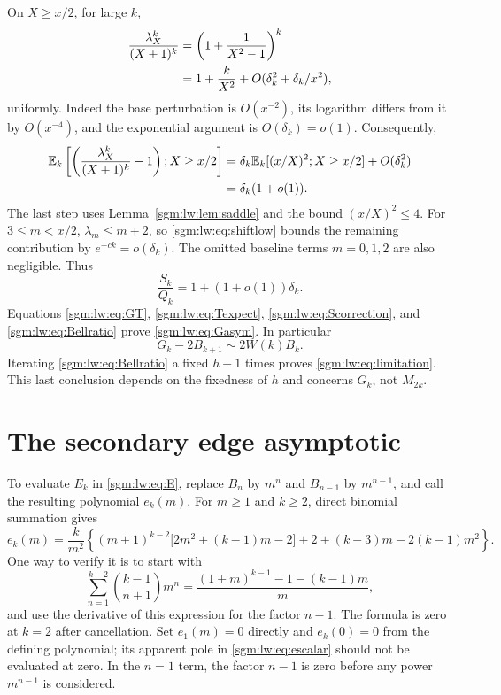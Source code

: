 \documentclass[11pt,letterpaper]{article}
\theoremstyle{remark}\newtheorem{remark}[theorem]{Remark}
\theoremstyle{definition}\newtheorem{definition}[theorem]{Definition}
\begin{document}
On $X\ge x/2$, for large $k$,
\begin{align}
 \frac{\lambda_X^k}{(X+1)^k}
 &=\left(1+\frac1{X^2-1}\right)^k\notag\\
 &=1+\frac{k}{X^2}+O(\delta_k^2+\delta_k/x^2),\label{sgm:lw:eq:shift}
\end{align}
uniformly. Indeed the base perturbation is $O(x^{-2})$, its logarithm differs from it by $O(x^{-4})$, and the exponential argument is $O(\delta_k)=o(1)$. Consequently,
\begin{align*}
 \mathbb E_k\left[\left(\frac{\lambda_X^k}{(X+1)^k}-1\right); X\ge x/2\right]
 &=\delta_k\mathbb E_k[(x/X)^2; X\ge x/2]+O(\delta_k^2)\\
 &=\delta_k(1+o(1)).
\end{align*}
The last step uses Lemma~\ref{sgm:lw:lem:saddle} and the bound $(x/X)^2\le4$.
For $3\le m<x/2$, $\lambda_m\le m+2$, so \eqref{sgm:lw:eq:shiftlow} bounds the remaining contribution by $e^{-ck}=o(\delta_k)$. The omitted baseline terms $m=0,1,2$ are also negligible. Thus
\begin{equation}\label{sgm:lw:eq:Scorrection}
 \frac{S_k}{Q_k}=1+(1+o(1))\delta_k.
\end{equation}
Equations \eqref{sgm:lw:eq:GT}, \eqref{sgm:lw:eq:Texpect}, \eqref{sgm:lw:eq:Scorrection}, and \eqref{sgm:lw:eq:Bellratio} prove \eqref{sgm:lw:eq:Gasym}. In particular
\begin{equation}\label{sgm:lw:eq:Gadditive}
 G_k-2B_{k+1}\sim2W(k)B_k.
\end{equation}
Iterating \eqref{sgm:lw:eq:Bellratio} a fixed $h-1$ times proves \eqref{sgm:lw:eq:limitation}. This last conclusion depends on the fixedness of $h$ and concerns $G_k$, not $M_{2k}$.

\section{The secondary edge asymptotic}
To evaluate $E_k$ in \eqref{sgm:lw:eq:E}, replace $B_n$ by $m^n$ and $B_{n-1}$ by $m^{n-1}$, and call the resulting polynomial $e_k(m)$. For $m\ge1$ and $k\ge2$, direct binomial summation gives
\begin{equation}\label{sgm:lw:eq:escalar}
 e_k(m)=\frac{k}{m^2}\left\{
 (m+1)^{k-2}\bigl[2m^2+(k-1)m-2\bigr]
 +2+(k-3)m-2(k-1)m^2\right\}.
\end{equation}
One way to verify it is to start with
\[
 \sum_{n=1}^{k-2}\binom{k-1}{n+1}m^n
 =\frac{(1+m)^{k-1}-1-(k-1)m}{m},
\]
and use the derivative of this expression for the factor $n-1$. The formula is zero at $k=2$ after cancellation. Set $e_1(m)=0$ directly and $e_k(0)=0$ from the defining polynomial; its apparent pole in \eqref{sgm:lw:eq:escalar} should not be evaluated at zero. In the $n=1$ term, the factor $n-1$ is zero before any power $m^{n-1}$ is considered.
\end{document}
